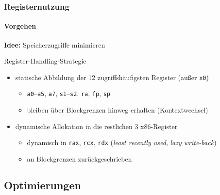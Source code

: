 \begin{frame}
	\frametitle{Registernutzung}
	\framesubtitle{Vorgehen}
	
	\textbf{Idee:} Speicherzugriffe minimieren
	
	\vspace{0.50cm}
	
	\begin{block}{Register-Handling-Strategie}
		\begin{itemize}
			\item statische Abbildung der 12 zugriffshäufigsten Register (außer \texttt{x0})
			\begin{itemize}
				\item \texttt{a0}--\texttt{a5}, \texttt{a7}, \texttt{s1}--\texttt{s2}, \texttt{ra}, \texttt{fp}, \texttt{sp}
				\item bleiben über Blockgrenzen hinweg erhalten ( Kontextwechsel)
			\end{itemize}
			
			\item dynamische Allokation in die restlichen 3 x86-Register
			\begin{itemize}
				\item dynamisch in \texttt{rax}, \texttt{rcx}, \texttt{rdx} (\textit{least recently used}, \textit{lazy write-back})
				\item an Blockgrenzen zurückgeschrieben
			\end{itemize}
		\end{itemize}
	\end{block}
	
\end{frame}


\subsection{Optimierungen} %

